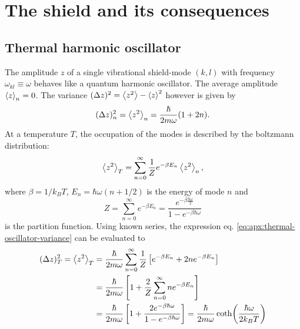 \chapter{The shield and its consequences}

\section{Thermal harmonic oscillator}\label{apx:thermal-harmonic-oscillator}
The amplitude $z$ of a single vibrational shield-mode $(k,l)$ with frequency $\omega_{kl} \equiv \omega$ behaves like a quantum harmonic oscillator. 
The average amplitude $\left\langle z\right\rangle_n = 0$. 
The variance $(\Delta z)^2 = \left\langle z^2\right\rangle - \left\langle z\right\rangle^2$ however is given by
\begin{equation}
  (\Delta z)^2_n = \left\langle z^2\right\rangle_n = \frac{\hbar}{2m\omega} (1+2n) .
\end{equation}
At a temperature $T$, the occupation of the modes is described by the boltzmann distribution:
\begin{equation}\label{eq:apx:thermal-oscillator-variance}
  \left\langle z^2\right\rangle_T = \sum_{n=0}^{\infty} \frac{1}{Z} e^{-\beta E_n} \left\langle z^2\right\rangle_n,
\end{equation}
where $\beta = 1/k_B T$, $E_n = \hbar \omega (n+1/2)$ is the energy of mode $n$ and
\begin{equation}
  Z = \sum_{n=0}^{\infty} e^{-\beta E_n} = \frac{e^{-\beta \frac{\hbar \omega}{2}}}{1-e^{-\beta \hbar \omega}}
\end{equation}
is the partition function. Using known series, the expression eq. \eqref{eq:apx:thermal-oscillator-variance} can be evaluated to
\begin{align}
  (\Delta z)^2_T = \left\langle z^2\right\rangle_T &= \frac{\hbar}{2m\omega} \sum_{n=0}^{\infty} \frac{1}{Z}\left[e^{-\beta E_n} + 2ne^{-\beta E_n}\right] \\
  &= \frac{\hbar}{2m\omega} \left[1 + \frac{2}{Z}\sum_{n=0}^{\infty} n e^{-\beta E_n}\right] \\
  &= \frac{\hbar}{2m\omega} \left[1 + \frac{2e^{-\beta\hbar\omega}}{1-e^{-\beta\hbar\omega}} \right] = \frac{\hbar}{2m\omega} \coth(\frac{\hbar \omega}{2 k_B T})
\end{align}